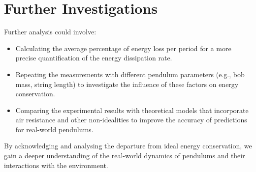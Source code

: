 
\section{Further Investigations}

Further analysis could involve:

\begin{itemize}
	\item Calculating the average percentage of energy loss per period for a more precise quantification of the energy dissipation rate.
	\item Repeating the measurements with different pendulum parameters (e.g., bob mass, string length) to investigate the influence of these factors on energy conservation.
	\item Comparing the experimental results with theoretical models that incorporate air resistance and other non-idealities to improve the accuracy of predictions for real-world pendulums.
\end{itemize}

By acknowledging and analysing the departure from ideal energy conservation, we gain a deeper understanding of the real-world dynamics of pendulums and their interactions with the environment.

